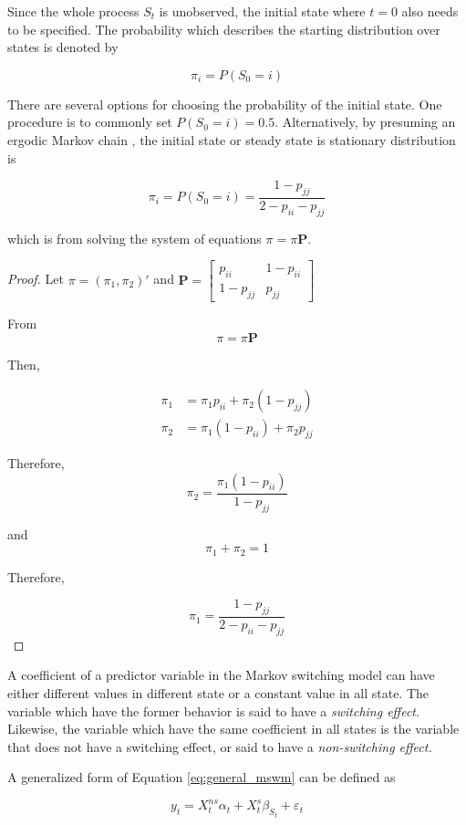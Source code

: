 Since the whole process $S_{t}$ is unobserved, the initial state
where $t=0$ also needs to be specified. The probability which describes
the starting distribution over states is denoted by

\[
\pi_{i}=P(S_{0}=i)
\]

There are several options for choosing the probability of the initial
state. One procedure is to commonly set $P(S_{0}=i)=0.5$. Alternatively,
by presuming an ergodic Markov chain \citep{hamilton2005regime},
the initial state or steady state is stationary distribution is 

\[
\pi_{i}=P(S_{0}=i)=\frac{1-p_{jj}}{2-p_{ii}-p_{jj}}
\]

which is from solving the system of equations $\pi=\pi\mathbf{P}$.
\begin{proof}
Let $\pi=(\pi_{1},\pi_{2})'$ and $\mathbf{P}=\left[\begin{array}{cc}
p_{ii} & 1-p_{ii}\\
1-p_{jj} & p_{jj}
\end{array}\right]$

From 
\[
\pi=\pi\mathbf{P}
\]

Then,

\begin{align*}
\pi_{1} & =\pi_{1}p_{ii}+\pi_{2}(1-p_{jj})\\
\pi_{2} & =\pi_{1}(1-p_{ii})+\pi_{2}p_{jj}
\end{align*}

Therefore, 
\[
\pi_{2}=\frac{\pi_{1}(1-p_{ii})}{1-p_{jj}}
\]

and 
\[
\pi_{1}+\pi_{2}=1
\]

Therefore,

\[
\pi_{1}=\frac{1-p_{jj}}{2-p_{ii}-p_{jj}}
\]
\end{proof}
A coefficient of a predictor variable in the Markov switching model
can have either different values in different state or a constant
value in all state. The variable which have the former behavior is
said to have a \emph{switching effect}. Likewise, the variable which
have the same coefficient in all states is the variable that does
not have a switching effect, or said to have a \emph{non-switching
effect.} 

A generalized form of Equation \ref{eq:general_mswm} can be defined
as \citep{perlin2015ms_regress}

\begin{equation}
y_{t}=X_{t}^{ns}\alpha_{t}+X_{t}^{s}\beta_{S_{t}}+\varepsilon_{t}
\end{equation}

